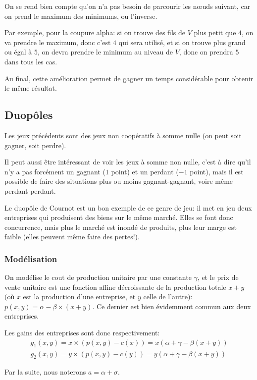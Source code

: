 On se rend bien compte qu'on n'a pas besoin de parcourir les nœuds suivant,
car on prend le maximum des minimums, ou l'inverse.

Par exemple, pour la coupure alpha: si on trouve des fils de $V$ plus petit
que $4$, on va prendre le maximum, donc c'est $4$ qui sera utilisé, et si on
trouve plus grand ou égal à $5$, on devra prendre le minimum au niveau de $V$,
donc on prendra $5$ dans tous les cas.

Au final, cette amélioration permet de gagner un temps considérable pour
obtenir le même résultat.


\subsection{Duopôles}
  Les jeux précédents sont des jeux non coopératifs à somme nulle (on peut soit
  gagner, soit perdre).

  Il peut aussi être intéressant de voir les jeux à somme non nulle, c'est à
  dire qu'il n'y a pas forcément un gagnant ($1$ point) et un perdant ($-1$
  point), mais il est possible de faire des situations plus ou moins
  gagnant-gagnant, voire même perdant-perdant.

  Le duopôle de Cournot est un bon exemple de ce genre de jeu: il met en jeu
  deux entreprises qui produisent des biens sur le même marché. Elles se font
  donc concurrence, mais plus le marché est inondé de produits, plus leur marge
  est faible (elles peuvent même faire des pertes!).

  \subsubsection{Modélisation}
    On modélise le cout de production unitaire par une constante $\gamma$,
    et le prix de vente unitaire est une fonction affine décroissante de la
    production totale $x+y$ (où $x$ est la production d'une entreprise, et $y$
    celle de l'autre): $p(x, y) = \alpha - \beta\times (x + y)$. Ce dernier est bien
    évidemment commun aux deux entreprises.

    Les gains des entreprises sont donc respectivement:
      \[\begin{array}{c}
        g_1(x, y) = x\times (p(x, y)-c(x)) = x(\alpha+\gamma-\beta(x+y)) \\
        g_2(x, y) = y\times (p(x, y)-c(y)) = y(\alpha+\gamma-\beta(x+y))
      \end{array}\]

    Par la suite, nous noterons $a=\alpha+\sigma$.

